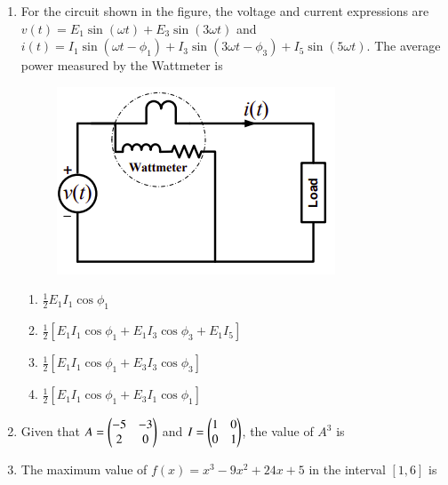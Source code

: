 \documentclass[journal,12pt,onecolumn]{IEEEtran}
\theoremstyle{remark}
\begin{document}
\begin{enumerate}[start=1, label=Q.\arabic*]
\item For the circuit shown in the figure, the voltage and current expressions are $v(t)=E_{1}\sin(\omega t)+E_{3}\sin(3\omega t)$ and $i(t)=I_{1}\sin(\omega t-\phi_{1})+I_{3}\sin(3\omega t-\phi_{3})+I_{5}\sin(5\omega t)$. The average power measured by the Wattmeter is
\begin{figure}[H]
    \centering
    \includegraphics[width=0.4\columnwidth]{Figures/q25.png}
    \caption{}
\end{figure}

\begin{enumerate}
    \item $\frac{1}{2}E_{1}I_{1}\cos\phi_{1}$
    \item $\frac{1}{2}[E_{1}I_{1}\cos\phi_{1}+E_{1}I_{3}\cos\phi_{3}+E_{1}I_{5}]$
    \item $\frac{1}{2}[E_{1}I_{1}\cos\phi_{1}+E_{3}I_{3}\cos\phi_{3}]$
    \item $\frac{1}{2}[E_{1}I_{1}\cos\phi_{1}+E_{3}I_{1}\cos\phi_{1}]$
\end{enumerate}
\hfill{}

\item Given that $A=\begin{pmatrix}-5 & -3 \\ 2 & 0\end{pmatrix}$ and $I=\begin{pmatrix}1 & 0 \\ 0 & 1\end{pmatrix}$, the value of $A^{3}$ is

\begin{enumerate}
\end{enumerate}
\hfill{}

\item The maximum value of $f(x)=x^{3}-9x^{2}+24x+5$ in the interval $[1, 6]$ is

\begin{enumerate}
\end{enumerate}
\hfill{}


\end{enumerate}
\end{document}
